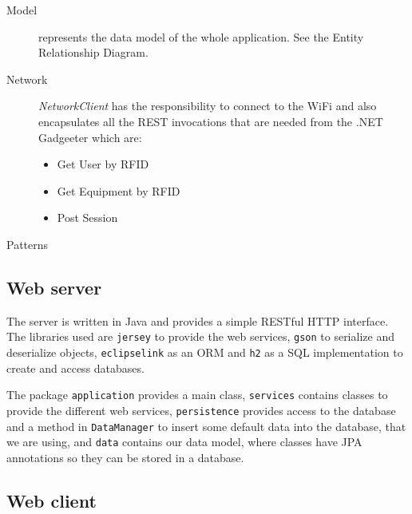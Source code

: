 \documentclass{tk3-team}
\begin{document}
\begin{description}
\item[Model] represents the data model of the whole application. See the Entity Relationship Diagram. 

\item[Network] \textit{NetworkClient} has the responsibility to connect to the WiFi and also encapsulates all the REST invocations that are needed from the .NET Gadgeeter which are: 
\begin{itemize}
	\item Get User by RFID
	\item Get Equipment by RFID 
	\item Post Session
\end{itemize}


\item[Patterns] 

\end{description}

\subsection{Web server}

The server is written in Java and provides a simple RESTful HTTP interface. The libraries used are \texttt{jersey} to provide the web services, \texttt{gson} to serialize and deserialize objects, \texttt{eclipselink} as an ORM and \texttt{h2} as a SQL implementation to create and access databases.

The package \texttt{application} provides a main class, \texttt{services} contains classes to provide the different web services, \texttt{persistence} provides access to the database and a method in \texttt{DataManager} to insert some default data into the database, that we are using, and \texttt{data} contains our data model, where classes have JPA annotations so they can be stored in a database.


\subsection{Web client}
\end{document}
